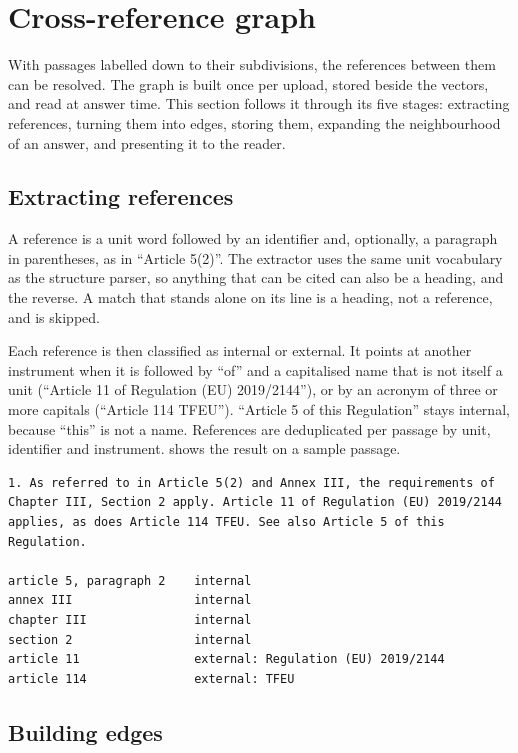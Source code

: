 \section{Cross-reference graph}
\label{sec:graph}

With passages labelled down to their subdivisions, the references between them
can be resolved. The graph is built once per upload, stored beside the vectors,
and read at answer time. This section follows it through its five stages:
extracting references, turning them into edges, storing them, expanding the
neighbourhood of an answer, and presenting it to the reader.

\subsection{Extracting references}

A reference is a unit word followed by an identifier and, optionally, a
paragraph in parentheses, as in ``Article 5(2)''. The extractor uses the same
unit vocabulary as the structure parser, so anything that can be cited can
also be a heading, and the reverse. A match that stands alone on its line is a
heading, not a reference, and is skipped.

Each reference is then classified as internal or external. It points at
another instrument when it is followed by ``of'' and a capitalised name that
is not itself a unit (``Article 11 of Regulation (EU) 2019/2144''), or by an
acronym of three or more capitals (``Article 114 TFEU''). ``Article 5 of this
Regulation'' stays internal, because ``this'' is not a name. References are
deduplicated per passage by unit, identifier and instrument.
 shows the result on a sample passage.

\begin{lstlisting}[float, numbers=none, caption={References extracted from a sample
passage.}, label={lst:references}]
1. As referred to in Article 5(2) and Annex III, the requirements of
Chapter III, Section 2 apply. Article 11 of Regulation (EU) 2019/2144
applies, as does Article 114 TFEU. See also Article 5 of this Regulation.

article 5, paragraph 2    internal
annex III                 internal
chapter III               internal
section 2                 internal
article 11                external: Regulation (EU) 2019/2144
article 114               external: TFEU
\end{lstlisting}

\subsection{Building edges}

